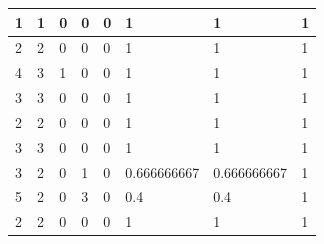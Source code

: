 \begin{small}
\begin{longtable}{|l|l|l|l|l|l|l|l|}
1  & 1                                & 0                                & 0                                & 0                                & 1                                      & 1                                       & 1                                    \\ \hline
2  & 2                                & 0                                & 0                                & 0                                & 1                                      & 1                                       & 1                                    \\ \hline
4  & 3                                & 1                                & 0                                & 0                                & 1                                      & 1                                       & 1                                    \\ \hline
3  & 3                                & 0                                & 0                                & 0                                & 1                                      & 1                                       & 1                                    \\ \hline
2  & 2                                & 0                                & 0                                & 0                                & 1                                      & 1                                       & 1                                    \\ \hline
3  & 3                                & 0                                & 0                                & 0                                & 1                                      & 1                                       & 1                                    \\ \hline
3  & 2                                & 0                                & 1                                & 0                                & 0.666666667                            & 0.666666667                             & 1                                    \\ \hline
5  & 2                                & 0                                & 3                                & 0                                & 0.4                                    & 0.4                                     & 1                                    \\ \hline
2  & 2                                & 0                                & 0                                & 0                                & 1                                      & 1                                       & 1                                    \\ \hline

\end{longtable}
\end{small}
